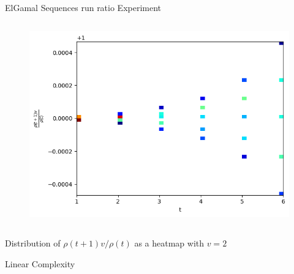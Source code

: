 \begin{frame}{ElGamal Sequences run ratio Experiment}
\begin{columns}
\begin{column}{0.45\textwidth}
\begin{figure}
                \includegraphics[width=\textwidth]{figures/v2AndvisGenNormalizedrunratio.png}
            \end{figure}
        \end{column}
    \end{columns}
    \begin{center}
                Distribution of $\rho(t+1)v/\rho(t)$ as a heatmap with $v = 2$
    \end{center}
\end{frame}

\begin{frame}{Linear Complexity}
  \end{frame}


